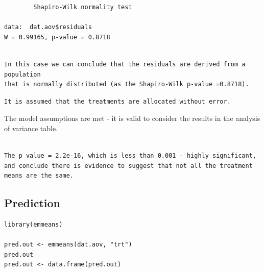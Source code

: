 \documentclass[a4paper, 10pt, fleqn, twosided]{memoir}
\begin{document}
\begin{tcolorbox}[title = Example 2 Shapiro-Wilk normality test output]
\begin{verbatim}
        Shapiro-Wilk normality test

data:  dat.aov$residuals
W = 0.99165, p-value = 0.8718
\end{verbatim}
\end{tcolorbox}


\begin{tcolorbox}[title = Example 2 Shapiro-Wilk normality test interpretation]
\begin{verbatim}

In this case we can conclude that the residuals are derived from a population
that is normally distributed (as the Shapiro-Wilk p-value =0.8718).

\end{verbatim}
\end{tcolorbox}



\begin{tcolorbox}[title = Example2 Assumption 5]
\begin{verbatim}
It is assumed that the treatments are allocated without error.
\end{verbatim}
\end{tcolorbox}

The model assumptions are met - it is valid to consider the results in the analysis of variance table.

\begin{tcolorbox}[title = Example 2 ANOVA interpretation]
\begin{verbatim}

The p value = 2.2e-16, which is less than 0.001 - highly significant,
and conclude there is evidence to suggest that not all the treatment
means are the same.

\end{verbatim}
\end{tcolorbox}
\subsection{Prediction}

\begin{tcolorbox}[title = Example 2 predicted values]
\begin{verbatim}
library(emmeans)

pred.out <- emmeans(dat.aov, "trt")
pred.out
pred.out <- data.frame(pred.out)
\end{verbatim}
\end{tcolorbox}
\end{document}
